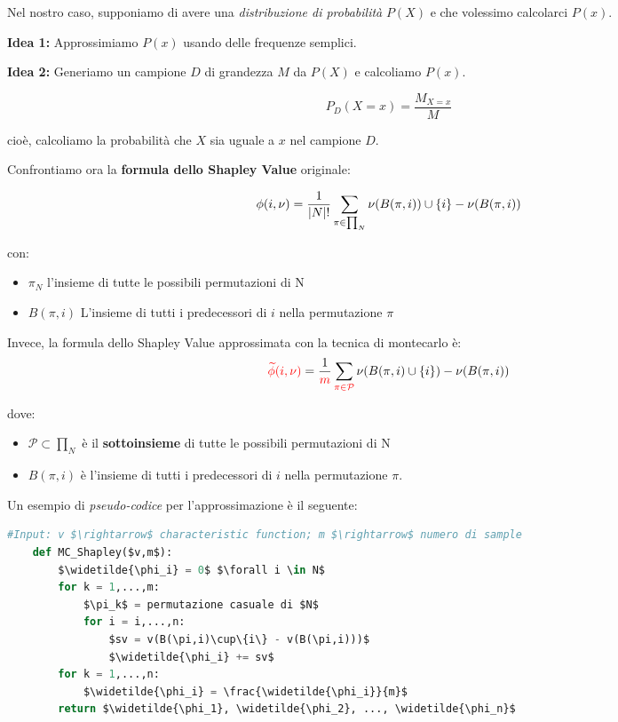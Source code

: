 Nel nostro caso, supponiamo di avere una \textit{distribuzione di probabilità}
$P(X)$ e che volessimo calcolarci $P(x)$.

\textbf{Idea 1:} Approssimiamo $P(x)$ usando delle frequenze semplici.

\textbf{Idea 2:} Generiamo un campione $D$ di grandezza $M$ da $P(X)$ e calcoliamo $P(x)$.

\[
    P_D(X=x) = \frac{M_{X=x}}{M}
\]

cioè, calcoliamo la probabilità che $X$ sia uguale a $x$ nel campione $D$.

Confrontiamo ora la \textbf{formula dello Shapley Value} originale:

\[
    \phi(i,\nu) = \frac{1}{|N|!} \sum_{\pi \in \prod_N} \nu(B(\pi, i)) \cup \{i\} - \nu(B(\pi, i))
\]

con:
\begin{itemize}
    \item $\pi_N$ l'insieme di tutte le possibili permutazioni di N
    \item $B(\pi, i)$ L'insieme di tutti i predecessori di $i$ nella permutazione $\pi$
\end{itemize}

Invece, la formula dello Shapley Value approssimata con la tecnica di
montecarlo è:
\[
    \textcolor{red}{\widetilde{\phi}(i,\nu)} = \frac{1}{\textcolor{red}{m}} \sum_{\textcolor{red}{\pi \in \mathcal{P}}} \nu(B(\pi,i) \cup \{i\}) - \nu(B(\pi,i))
\]

dove:

\begin{itemize}
    \item $\mathcal{P} \subset \prod_N$ è il \textbf{sottoinsieme} di tutte le possibili permutazioni di N
    \item $B(\pi,i)$ è l'insieme di tutti i predecessori di $i$ nella permutazione $\pi$.
\end{itemize}

Un esempio di \textit{pseudo-codice} per l'approssimazione è il seguente:

\begin{esempio}
\end{esempio}

\begin{lstlisting}[language=Python, mathescape]
    #Input: v $\rightarrow$ characteristic function; m $\rightarrow$ numero di sample
    def MC_Shapley($v,m$):
        $\widetilde{\phi_i} = 0$ $\forall i \in N$
        for k = 1,...,m:
            $\pi_k$ = permutazione casuale di $N$
            for i = i,...,n:
                $sv = v(B(\pi,i)\cup\{i\} - v(B(\pi,i)))$
                $\widetilde{\phi_i} += sv$
        for k = 1,...,n:
            $\widetilde{\phi_i} = \frac{\widetilde{\phi_i}}{m}$
        return $\widetilde{\phi_1}, \widetilde{\phi_2}, ..., \widetilde{\phi_n}$
\end{lstlisting}

